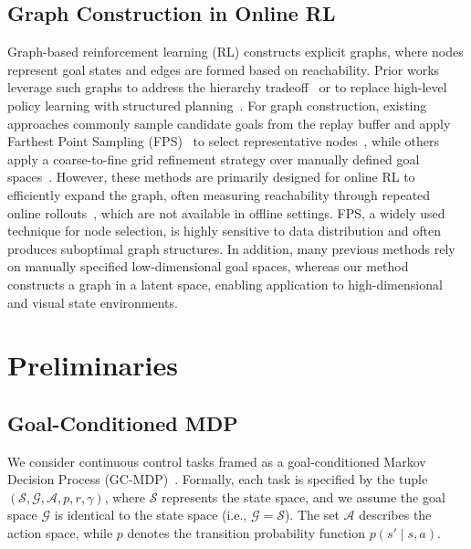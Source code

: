 \documentclass{article}
\begin{document}
\subsection{Graph Construction in Online RL}
Graph-based reinforcement learning (RL) constructs explicit graphs, where nodes represent goal states and edges are formed based on reachability. Prior works leverage such graphs to address the hierarchy tradeoff~\cite{lee2022dhrl} or to replace high-level policy learning with structured planning~\cite{eysenbach2019search, hoang2021successor}. For graph construction, existing approaches commonly sample candidate goals from the replay buffer and apply Farthest Point Sampling (FPS)~\cite{Eldar1994} to select representative nodes~\cite{kim2021landmark, lee2022dhrl, kim2023imitating, park2024ngte}, while others apply a coarse-to-fine grid refinement strategy over manually defined goal spaces~\cite{yoon2024breadth}. However, these methods are primarily designed for online RL to efficiently expand the graph, often measuring reachability through repeated online rollouts~\cite{faust2018prmrl, bagaria2020skill, yoon2024breadth}, which are not available in offline settings. FPS, a widely used technique for node selection, is highly sensitive to data distribution and often produces suboptimal graph structures. In addition, many previous methods rely on manually specified low-dimensional goal spaces, whereas our method constructs a graph in a latent space, enabling application to high-dimensional and visual state environments.


\section{Preliminaries}
\subsection{Goal-Conditioned MDP}
We consider continuous control tasks framed as a goal-conditioned Markov Decision Process (GC-MDP)~\cite{kaelbling1993learning}. Formally, each task is specified by the tuple \((\mathcal{S}, \mathcal{G}, \mathcal{A}, p, r, \gamma)\), where \(\mathcal{S}\) represents the state space, and we assume the goal space \(\mathcal{G}\) is identical to the state space (i.e., \(\mathcal{G} = \mathcal{S}\)). The set \(\mathcal{A}\) describes the action space, while \(p\) denotes the transition probability function \(p(s' \mid s, a)\).
\end{document}

